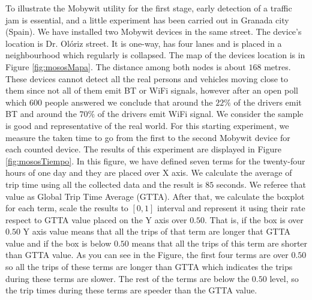 \documentclass[preprint]{elsarticle}
\begin{document}
To illustrate the Mobywit utility for the first stage, early detection of a traffic jam is essential, and a little experiment has been carried out in Granada city (Spain). We have installed two Mobywit devices in the same street. The device's location is Dr. Ol\'{o}riz street. It is one-way, has four lanes and is placed in a neighbourhood which regularly is collapsed. The map of the devices location is in Figure \ref{fig:mososMapa}. The distance among both nodes is about $168$ metres. These devices cannot detect all the real persons and vehicles moving close to them since not all of them emit BT or WiFi signals, however after an open poll which $600$ people answered we conclude that around the $22\%$ of the drivers emit BT and around the $70\%$ of the drivers emit WiFi signal. We consider the sample is good and representative of the real world. For this starting experiment, we measure the taken time to go from the first to the second Mobywit device for each counted device. The results of this experiment are displayed in Figure \ref{fig:mososTiempo}. In this figure, we have defined seven terms for the twenty-four hours of one day and they are placed over X axis. We calculate the average of trip time using all the collected data and the result is $85$ seconds. We referee that value as Global Trip Time Average (GTTA). After that, we calculate the boxplot for each term, scale the results to $[0,1]$ interval and represent it using their rate respect to GTTA value placed on the Y axis over $0.50$. That is, if the box is over $0.50$ Y axis value means that all the trips of that term are longer that GTTA value and if the box is below $0.50$ means that all the trips of this term are shorter than GTTA value. As you can see in the Figure, the first four terms are over $0.50$ so all the trips of these terms are longer than GTTA which indicates the trips during these terms are slower. The rest of the terms are below the $0.50$ level, so the trip times during these terms are speeder than the GTTA value. 
\end{document}
